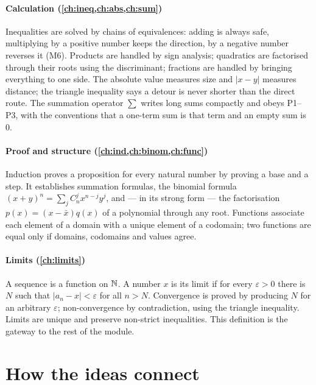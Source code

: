 \paragraph{Calculation (\cref{ch:ineq,ch:abs,ch:sum})} Inequalities are solved by chains of equivalences: adding is always
safe, multiplying by a positive number keeps the direction, by a negative number reverses it (M6). Products are handled by
sign analysis; quadratics are factorised through their roots using the discriminant; fractions are handled by bringing
everything to one side. The absolute value measures size and $|x-y|$ measures distance; the triangle inequality says a
detour is never shorter than the direct route. The summation operator $\sum$ writes long sums compactly and obeys P1--P3,
with the conventions that a one-term sum is that term and an empty sum is $0$.

\paragraph{Proof and structure (\cref{ch:ind,ch:binom,ch:func})} Induction proves a proposition for every natural number
by proving a base and a step. It establishes summation formulas, the binomial formula
$(x+y)^n=\sum_jC_n^jx^{n-j}y^j$, and --- in its strong form --- the factorisation $p(x)=(x-\bar x)q(x)$ of a polynomial
through any root. Functions associate each element of a domain with a unique element of a codomain; two functions are equal
only if domains, codomains and values agree.

\paragraph{Limits (\cref{ch:limits})} A sequence is a function on $\mathbb{N}$. A number $x$ is its limit if for every
$\varepsilon>0$ there is $N$ such that $|a_n-x|<\varepsilon$ for all $n>N$. Convergence is proved by producing $N$ for an
arbitrary $\varepsilon$; non-convergence by contradiction, using the triangle inequality. Limits are unique and preserve
non-strict inequalities. This definition is the gateway to the rest of the module.

\section*{How the ideas connect}

